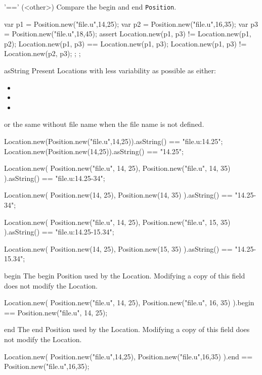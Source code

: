 \begin{urbiscriptapi}
\item['=='](<other>)%
  Compare the begin and end \lstinline|Position|.
\begin{urbiscript}
{
  var p1 = Position.new("file.u",14,25);
  var p2 = Position.new("file.u",16,35);
  var p3 = Position.new("file.u",18,45);
  assert
  {
    Location.new(p1, p3) != Location.new(p1, p2);
    Location.new(p1, p3) == Location.new(p1, p3);
    Location.new(p1, p3) != Location.new(p2, p3);
  };
};
\end{urbiscript}


\item[asString]%
  Present Locations with less variability as possible as either:
  \begin{itemize}
  \item {}
  \item {}
  \item {}
  \end{itemize}
  or the same without file name when the file name is not defined.
\begin{urbiassert}
Location.new(Position.new("file.u",14,25)).asString() == "file.u:14.25";
Location.new(Position.new(14,25)).asString() == "14.25";

Location.new(
  Position.new("file.u", 14, 25),
  Position.new("file.u", 14, 35)
).asString() == "file.u:14.25-34";

Location.new(
  Position.new(14, 25),
  Position.new(14, 35)
).asString() == "14.25-34";

Location.new(
  Position.new("file.u", 14, 25),
  Position.new("file.u", 15, 35)
).asString() == "file.u:14.25-15.34";

Location.new(
  Position.new(14, 25),
  Position.new(15, 35)
).asString() == "14.25-15.34";
\end{urbiassert}


\item[begin]%
  The begin Position used by the Location.  Modifying a copy of this field
  does not modify the Location.
\begin{urbiassert}
Location.new(
  Position.new("file.u", 14, 25),
  Position.new("file.u", 16, 35)
).begin == Position.new("file.u", 14, 25);
\end{urbiassert}


\item[end]%
  The end Position used by the Location.  Modifying a copy of this field
  does not modify the Location.
\begin{urbiassert}
Location.new(
  Position.new("file.u",14,25),
  Position.new("file.u",16,35)
).end == Position.new("file.u",16,35);
\end{urbiassert}
\end{urbiscriptapi}


